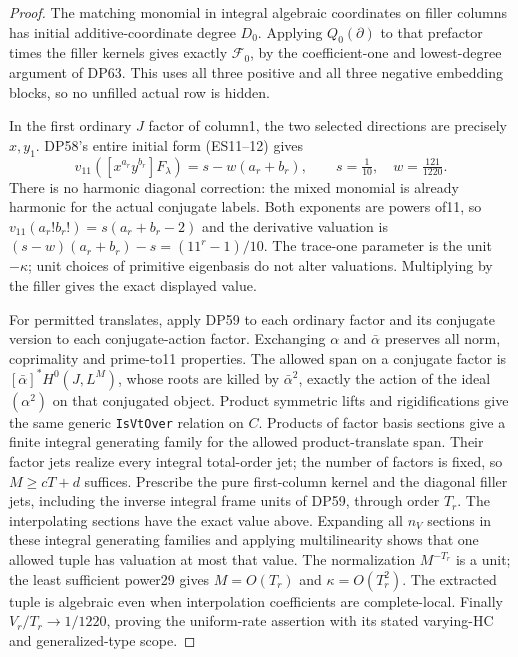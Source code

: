 \begin{proof}
The matching monomial in integral algebraic coordinates on filler
columns has initial additive-coordinate degree $D_0$. Applying
$Q_0(\partial)$ to that prefactor times the filler kernels gives exactly
$\mathcal F_0$, by the coefficient-one and lowest-degree argument of
DP63. This uses all three positive and all three negative embedding
blocks, so no unfilled actual row is hidden.

In the first ordinary $J$ factor of column1, the two selected directions
are precisely $x,y_1$. DP58's entire initial form (ES11--12) gives
\[
 v_{11}([x^{a_r}y^{b_r}]F_\lambda)=s-w(a_r+b_r),
 \qquad s=\tfrac1{10},\quad w=\tfrac{121}{1220}.
\]
There is no harmonic diagonal correction: the mixed monomial is already
harmonic for the actual conjugate labels. Both exponents are powers of11,
so $v_{11}(a_r!b_r!)=s(a_r+b_r-2)$ and the derivative valuation is
$(s-w)(a_r+b_r)-s=(11^r-1)/10$. The trace-one parameter is the unit
$-\kappa$; unit choices of primitive eigenbasis do not alter valuations.
Multiplying by the filler gives the exact displayed value.

For permitted translates, apply DP59 to each ordinary factor and its
conjugate version to each conjugate-action factor. Exchanging
$\alpha$ and $\bar\alpha$ preserves all norm, coprimality and prime-to11
properties. The allowed span on a conjugate factor is
$[\bar\alpha]^*H^0(J,L^M)$, whose roots are killed by
$\bar\alpha^2$, exactly the action of the ideal $(\alpha^2)$ on that
conjugated object. Product symmetric lifts and rigidifications give the
same generic \texttt{IsVtOver} relation on $C$.
Products of factor basis sections give a finite integral generating family
for the allowed product-translate span. Their factor jets realize every
integral total-order jet; the number of factors is fixed, so $M\ge cT+d$ suffices.
Prescribe the pure first-column kernel and the diagonal filler jets,
including the inverse integral frame units of DP59, through order $T_r$.
The interpolating sections have the exact value above. Expanding all
$n_V$ sections in these integral generating families and applying multilinearity
shows that one allowed tuple has valuation at most that value.
The normalization $M^{-T_r}$ is a unit; the least sufficient power29
gives $M=O(T_r)$ and $\kappa=O(T_r^2)$. The extracted tuple is algebraic
even when interpolation coefficients are complete-local.
Finally $V_r/T_r\to1/1220$, proving the uniform-rate assertion with
its stated varying-HC and generalized-type scope.
\end{proof}
